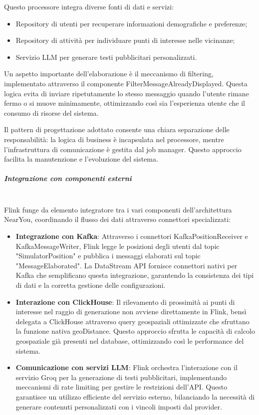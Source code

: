 \documentclass[10pt]{article}
\newcommand{\mysubparagraph}[1]{\subparagraph{#1}\mbox{}\\}
\begin{document}
        Questo processore integra diverse fonti di dati e servizi:
        \begin{itemize}
            \item Repository di utenti per recuperare informazioni demografiche e preferenze;
            \item Repository di attività per individuare punti di interesse nelle vicinanze;
            \item Servizio LLM per generare testi pubblicitari personalizzati.
        \end{itemize}
        
        Un aspetto importante dell'elaborazione è il meccanismo di filtering, implementato attraverso il componente FilterMessageAlreadyDisplayed. Questa logica evita di inviare ripetutamente lo stesso messaggio quando l'utente rimane fermo o si muove minimamente, ottimizzando così sia l'esperienza utente che il consumo di risorse del sistema.
        
        Il pattern di progettazione adottato consente una chiara separazione delle responsabilità: la logica di business è incapsulata nel processore, mentre l'infrastruttura di comunicazione è gestita dal job manager. Questo approccio facilita la manutenzione e l'evoluzione del sistema.
        
        \mysubparagraph{Integrazione con componenti esterni}
        Flink funge da elemento integratore tra i vari componenti dell'architettura NearYou, coordinando il flusso dei dati attraverso connettori specializzati:
        
        \begin{itemize}
            \item \textbf{Integrazione con Kafka}: Attraverso i connettori KafkaPositionReceiver e KafkaMessageWriter, Flink legge le posizioni degli utenti dal topic "SimulatorPosition" e pubblica i messaggi elaborati sul topic "MessageElaborated". La DataStream API fornisce connettori nativi per Kafka che semplificano questa integrazione, garantendo la consistenza dei tipi di dati e la corretta gestione delle configurazioni.
            
            \item \textbf{Interazione con ClickHouse}: Il rilevamento di prossimità ai punti di interesse nel raggio di generazione non avviene direttamente in Flink, bensì delegata a ClickHouse attraverso query geospaziali ottimizzate che sfruttano la funzione nativa geoDistance. Questo approccio sfrutta le capacità di calcolo geospaziale già presenti nel database, ottimizzando così le performance del sistema.
            
            \item \textbf{Comunicazione con servizi LLM}: Flink orchestra l'interazione con il servizio Groq per la generazione di testi pubblicitari, implementando meccanismi di rate limiting per gestire le restrizioni dell'API. Questo garantisce un utilizzo efficiente del servizio esterno, bilanciando la necessità di generare contenuti personalizzati con i vincoli imposti dal provider.
        \end{itemize}
        
\end{document}
